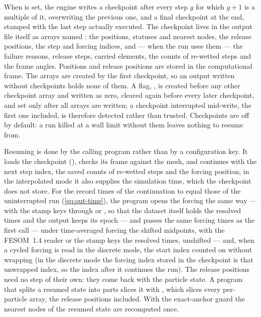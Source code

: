 When  is set, the engine writes a checkpoint after every step $g$ for which $g+1$ is a
multiple of it, overwriting the previous one, and a final checkpoint at the end, stamped with the last step
actually executed. The checkpoint lives in the output file itself as arrays named : the
positions, statuses and nearest nodes, the release positions, the step and forcing indices, and --- when the
run uses them --- the failure reasons, release steps, carried elements, the counts of re-wetted steps and the
frame angles. Positions and release positions are stored in the computational frame. The arrays are created
by the first checkpoint, so an output written without checkpoints holds none of them. A flag,
, is created before any other checkpoint array and written as zero, cleared again before
every later checkpoint, and set only after all arrays are written; a checkpoint interrupted mid-write, the
first one included, is therefore detected rather than trusted. Checkpoints are off by default: a run killed
at a wall limit without them leaves nothing to resume from.

Resuming is done by the calling program rather than by a configuration key. It loads the checkpoint
(), checks its frame against the mesh, and continues with the next step index, the saved
counts of re-wetted steps and the forcing position; in the interpolated mode it also supplies the simulation
time, which the checkpoint does not store. For the record times of the continuation to equal those of the
uninterrupted run (\cref{eq:out-time}), the program opens the forcing the same way --- with the stamp keys
through  or , so that the dataset itself holds the
resolved times and the output keeps its epoch --- and passes the same forcing times as the first call ---
under time-averaged forcing the shifted midpoints, with the FESOM~1.4 reader or the stamp keys the resolved
times, unshifted --- and, when a cycled forcing is read in the discrete
mode, the start index counted on without wrapping (in the discrete mode the forcing index stored in the
checkpoint is that unwrapped index, so the index after it continues the run).
The release positions need no step of their own: they come back with the particle state. A program that
splits a resumed state into parts slices it with , which slices every per-particle
array, the release positions included. With the exact-anchor guard the nearest nodes of the resumed state
are recomputed once.

